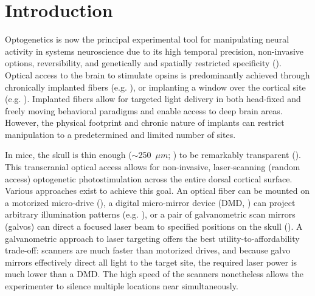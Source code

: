 \section{Introduction}
\label{sec:introduction}

Optogenetics is now the principal experimental tool for manipulating neural activity in systems neuroscience due to its high temporal precision, non-invasive options, reversibility, and genetically and spatially restricted specificity (\cite{Boyden2005Millisecond-timescaleActivity,OConnor2009ReverseBrain, Hausser2014Optogenetics:Light, Li2019SpatiotemporalCircuits,Emiliani2022OptogeneticsSystems.}).
Optical access to the brain to stimulate opsins is predominantly achieved through chronically implanted fibers (e.g. \cite{Mayrhofer2019DistinctTransformation,Babl2019TheInterneurons,Lohse2021SubcorticalMice,Duan2021ATask,Emiliani2022OptogeneticsSystems.}), or implanting a window over the cortical site (e.g. \cite{Schneider2018AMovement,Liu2016Cortico-fugalBehaviour}).
Implanted fibers allow for targeted light delivery in both head-fixed and freely moving behavioral paradigms and enable access to deep brain areas.
However, the physical footprint and chronic nature of implants can restrict manipulation to a predetermined and limited number of sites.


In mice, the skull is thin enough ($\sim$250~$\mu m$; \cite{Ghanbari2019Craniobot:Microsurgeries}) to be remarkably transparent (\cite{Steinzeig2017ChronicMice}).
This transcranial optical access allows for non-invasive, laser-scanning (random access) optogenetic photostimulation across the entire dorsal cortical surface.
Various approaches exist to achieve this goal.
An optical fiber can be mounted on a motorized micro-drive (\cite{Zatka-Haas2021SensoryDecision}), a digital micro-mirror device (DMD, \cite{Allen2017ApplicationSignaling}) can project arbitrary illumination patterns (e.g. \cite{Chong2020ManipulatingPerception}), or a pair of galvanometric scan mirrors (galvos) can direct a focused laser beam to specified positions on the skull (\cite{Guo2014FlowMice,Li2016RobustPlanning,Heindorf2018MouseFeedback,Inagaki2018Low-dimensionalCortex,Pinto2019Task-DependentRegions,Keller2020FeedbackCortex,Esmaeili2021RapidResponse,Voitov2022CorticalMemory,Pinto2022MultipleCortex,Coen2023MouseDecisions,Gauld2025AActions}).
A galvanometric approach to laser targeting offers the best utility-to-affordability trade-off: scanners are much faster than motorized drives, and because galvo mirrors effectively direct all light to the target site, the required laser power is much lower than a DMD.
The high speed of the scanners nonetheless allows the experimenter to silence multiple locations near simultaneously.

